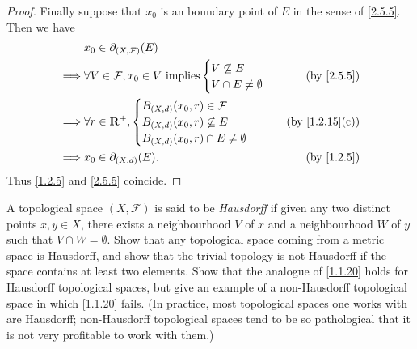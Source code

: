 \begin{proof}
  Finally suppose that \(x_0\) is an boundary point of \(E\) in the sense of \cref{2.5.5}.
  Then we have
  \begin{align*}
             & x_0 \in \partial_{(X, \mathcal{F})}(E)                                                        \\
    \implies & \forall V \in \mathcal{F}, x_0 \in V \text{ implies} \begin{cases}
                                                                      V \not\subseteq E \\
                                                                      V \cap E \neq \emptyset
                                                                    \end{cases} & \text{(by \cref{2.5.5})}   \\
    \implies & \forall r \in \R^+, \begin{cases}
                                     B_{(X, d)}(x_0, r) \in \mathcal{F} \\
                                     B_{(X, d)}(x_0, r) \not\subseteq E \\
                                     B_{(X, d)}(x_0, r) \cap E \neq \emptyset
                                   \end{cases}                           & \text{(by \cref{1.2.15}(c))}      \\
    \implies & x_0 \in \partial_{(X, d)}(E).                                      & \text{(by \cref{1.2.5})}
  \end{align*}
  Thus \cref{1.2.5} and \cref{2.5.5} coincide.
\end{proof}

\begin{exercise}\label{ex 2.5.4}
  A topological space \((X, \mathcal{F})\) is said to be \emph{Hausdorff} if given any two distinct points \(x, y \in X\), there exists a neighbourhood \(V\) of \(x\) and a neighbourhood \(W\) of \(y\) such that \(V \cap W = \emptyset\).
  Show that any topological space coming from a metric space is Hausdorff, and show that the trivial topology is not Hausdorff if the space contains at least two elements.
  Show that the analogue of \cref{1.1.20} holds for Hausdorff topological spaces, but give an example of a non-Hausdorff topological space in which \cref{1.1.20} fails.
  (In practice, most topological spaces one works with are Hausdorff;
  non-Hausdorff topological spaces tend to be so pathological that it is not very profitable to work with them.)
\end{exercise}

